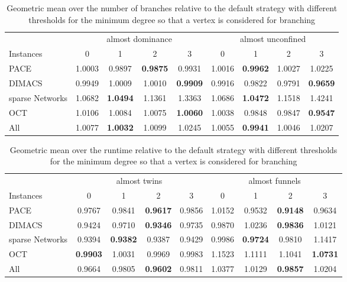 \documentclass[12pt,a4paper,twoside]{scrartcl}
\numberwithin{equation}{section}
\begin{document}
\begin{table}[hbt!]
	\centering
	\begin{tabular}{l|cccc|cccc|}	  & \multicolumn{4}{c|}{almost dominance} & \multicolumn{4}{c|}{almost unconfined} \\
		Instances & 0 & 1 & 2 & 3 & 0 & 1 & 2 & 3 \\ \hline
		PACE & 1.0003 & 0.9897 & \textbf{0.9875} & 0.9931 & 1.0016 & \textbf{0.9962} & 1.0027 & 1.0225\\
		DIMACS & 0.9949 & 1.0009 & 1.0010 & \textbf{0.9909} & 0.9916 & 0.9822 & 0.9791 & \textbf{0.9659}  \\
		sparse Networks & 1.0682 & \textbf{1.0494} & 1.1361 & 1.3363 & 1.0686 & \textbf{1.0472} & 1.1518 & 1.4241  \\
		OCT & 1.0106 & 1.0084 & 1.0075 & \textbf{1.0060} & 1.0038 & 0.9848 & 0.9847 & \textbf{0.9547} \\
		All & 1.0077 & \textbf{1.0032} & 1.0099 & 1.0245 & 1.0055 & \textbf{0.9941} & 1.0046 & 1.0207  \\
	\end{tabular}
	\caption{Geometric mean over the number of branches relative to the default strategy with different thresholds for the minimum degree so that a vertex is considered for branching}
	\label{tab:tune3}
	
\end{table}
\begin{table}[hbt!]
	\centering
	\begin{tabular}{l|cccc|cccc|}	  & \multicolumn{4}{c|}{almost twins} & \multicolumn{4}{c|}{almost funnels} \\
		Instances & 0 & 1 & 2 & 3 & 0 & 1 & 2 & 3 \\ \hline
		PACE & 0.9767 & 0.9841 & \textbf{0.9617} & 0.9856 & 1.0152 & 0.9532 & \textbf{0.9148} & 0.9634 \\		
		DIMACS & 0.9424 & 0.9710 & \textbf{0.9346} & 0.9735 & 0.9870 & 1.0236 & \textbf{0.9836} & 1.0121 \\		
		sparse Networks & 0.9394 & \textbf{0.9382} & 0.9387 & 0.9429 & 0.9986 & \textbf{0.9724} & 0.9810 & 1.1417  \\		
		OCT & \textbf{0.9903} & 1.0031 & 0.9969 & 0.9983 & 1.1523 & 1.1111 & 1.1041 & \textbf{1.0731} \\
		All & 0.9664 & 0.9805 & \textbf{0.9602} & 0.9811 & 1.0377 & 1.0129 & \textbf{0.9857} & 1.0204  \\
	\end{tabular}
	\caption{Geometric mean over the runtime relative to the default strategy with different thresholds for the minimum degree so that a vertex is considered for branching}
	\label{tab:tune2}
	
\end{table}
\end{document}
